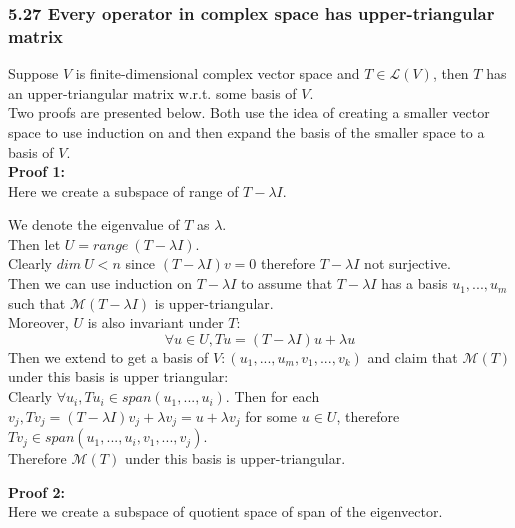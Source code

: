 \documentclass{article}
\begin{document}
\subsubsection*{5.27 Every operator in complex space has upper-triangular matrix}
Suppose $V$ is finite-dimensional complex vector space and $T \in \mathcal{L}(V)$, then $T$ has an upper-triangular matrix w.r.t. some basis of $V$.\\
Two proofs are presented below. Both use the idea of creating a smaller vector space to use induction on and then expand the basis of the smaller space to a basis of $V$.\\
\textbf{\Large{Proof 1:}}\\
Here we create a subspace of range of $T - \lambda I$.
\begin{addmargin}[1em]{0em}
    We denote the eigenvalue of $T$ as $\lambda$.\\
    Then let $U = range\ (T - \lambda I)$.\\
    Clearly $dim\ U < n$ since $(T - \lambda I)v = 0$ therefore $T-\lambda I$ not surjective.\\
    Then we can use induction on $T - \lambda I$ to assume that $T - \lambda I$ has a basis $u_1, ..., u_m$ such that $\mathcal{M}(T-\lambda I)$ is upper-triangular.\\
    Moreover, $U$ is also invariant under $T$:
    \begin{equation*}
        \forall u \in U, Tu = (T - \lambda I)u + \lambda u
    \end{equation*}
    Then we extend to get a basis of $V: (u_1, ..., u_m, v_1, ..., v_k)$ and claim that $\mathcal{M}(T)$ under this basis is upper triangular:\\
    Clearly $\forall u_i, Tu_i \in span(u_1, ..., u_i)$. Then for each $v_j, Tv_j = (T - \lambda I)v_j + \lambda v_j = u + \lambda v_j$ for some $u \in U$, therefore $Tv_j \in span(u_1, ..., u_i, v_1, ..., v_j)$.\\
    Therefore $\mathcal{M}(T)$ under this basis is upper-triangular.
\end{addmargin}
\textbf{\Large{Proof 2:}}\\
Here we create a subspace of quotient space of span of the eigenvector.
\end{document}

